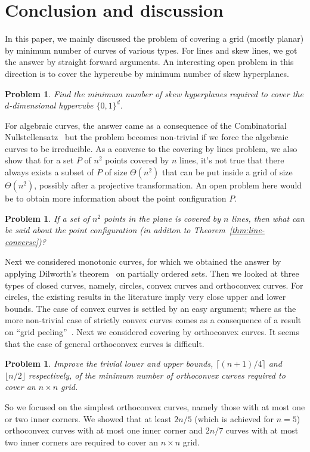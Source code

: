 \documentclass[
final
]{dmtcs-episciences}
\numberwithin{equation}{subsection}
\newtheorem{prob}[defn]{Problem}%
\begin{document}
\section{Conclusion and discussion}
\label{sec:conclude}
In this paper, we mainly discussed the problem of covering a grid (mostly planar) by minimum number of curves of various types. For lines and skew lines, we got the answer by straight forward arguments. An interesting open problem in this direction is to cover the hypercube by minimum number of skew hyperplanes. 
\begin{prob}
	Find the minimum number of skew hyperplanes required to cover the $d$-dimensional hypercube $\{0,1\}^d$.
\end{prob}
For algebraic curves, the answer came as a  consequence of the Combinatorial Nullstellensatz~\cite{alon_1999} but the problem becomes non-trivial if we force the algebraic curves to be irreducible. As a converse to the covering by lines problem, we also show that for a set $P$ of $n^2$ points covered by $n$ lines, it's not true that there always exists a subset of $P$ of size $\Theta(n^2)$ that can be put inside a grid of size $\Theta(n^2)$, possibly after a projective transformation. An open problem here would be to obtain more information about the point configuration $P$. 
\begin{prob}
	If a set of $n^2$ points in the plane is covered by $n$ lines, then what can be said about the point configuration (in additon to Theorem~\ref{thm:line-converse})?
\end{prob}
Next we considered monotonic curves, for which we obtained the answer by applying Dilworth's theorem~\cite{dilworth} on partially ordered sets. Then we looked at three types of closed curves, namely, circles, convex curves and orthoconvex curves. For circles, the existing results in the literature imply very close upper and lower bounds. The case of convex curves is settled by an easy argument; where as the more non-trivial case of strictly convex curves comes as a consequence of a result on ``grid peeling''~\cite{har}. Next we considered covering by orthoconvex curves. It seems that the case of general orthoconvex curves is difficult. 
\begin{prob}
	Improve the trivial lower and upper bounds, $\lceil (n+1)/4\rceil$ and $\lfloor n/2\rfloor$ respectively, of the minimum number of orthoconvex curves required to cover an $n\times n$ grid.
\end{prob}
So we focused on the simplest orthoconvex curves, namely those with at most one or two inner corners. We showed that at least $2n/5$ (which is achieved for $n=5$) orthoconvex curves with at most one inner corner and $2n/7$ curves with at most two inner corners are required to cover an $n\times n$ grid. 
\end{document}

